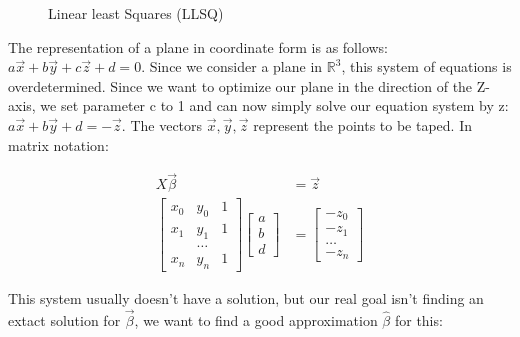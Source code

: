 \documentclass[11pt,oneside,openright]{mpreport}
\begin{document}
\begin{figure}[!ht]
\caption{Linear least Squares (LLSQ)}

\label{LLSQ_MIN}
\end{figure}


The representation of a plane in coordinate form is as follows: $ a\vec{x} + b\vec{y} + c\vec{z} + d = 0 $. Since we consider a plane in $\mathbb{R}^3$, this system of equations is overdetermined.
Since we want to optimize our plane in the direction of the Z-axis, we set parameter c to 1 and can now simply solve our equation system by z: $a\vec{x} + b\vec{y} + d = -\vec{z}$.
The vectors $\vec{x},\vec{y},\vec{z}$ represent the points to be taped.
In matrix notation:

\begin{align*}
X \vec{\beta} &= \vec{z}\\
\begin{bmatrix}
x_0 & y_0 & 1 \\
x_1 & y_1 & 1 \\
 & \dots & \\
x_n & y_n & 1 
\end{bmatrix} 
\begin{bmatrix}
a \\
b \\
d 
\end{bmatrix}
&= 
\begin{bmatrix}
-z_0 \\
-z_1 \\
\dots \\
-z_n 
\end{bmatrix} 
\end{align*}

This system usually doesn't have a solution, but our real goal isn't finding an extact solution for $\vec\beta$, we want to find a good approximation $\hat{\beta}$ for this:
\end{document}
